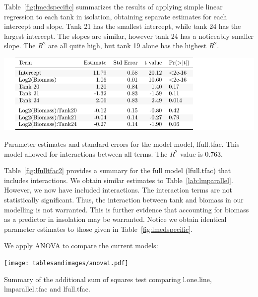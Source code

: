 Table~\ref{fig:lmedspecific} summarizes the results of applying simple linear regression to each tank in isolation, obtaining separate estimates for each intercept and slope. Tank 21 has the smallest intercept, while tank 24 has the largest intercept. The slopes are similar, however tank 24 has a noticeably smaller slope. The $R^{2}$ are all quite high, but tank 19 alone has the highest $R^{2}$. 



   \vspace{12pt}



\begin{table}[H]
\includegraphics{Chapter3Images/lfulltfac.pdf}
\caption{Parameter estimates and standard errors for the model model, lfull.tfac. This model allowed for interactions between all terms. The $R^{2}$ value is 0.763.}
\label{fig:lfulltfac2}
\end{table}

Table~\ref{fig:lfulltfac2} provides a summary for the full model (lfull.tfac) that includes interactions. We obtain similar estimates to Table~\ref{lab:lmparallel}. However, we now have included interactions. The interaction terms are not statistically significant.  Thus, the interaction between tank and biomass in our modelling is not warranted. This is further evidence that accounting for biomass as a predictor in insolation may be warranted. Notice we obtain identical parameter estimates to those given in Table~\ref{fig:lmedspecific}.

\newpage

We apply ANOVA to compare the current models:

   \vspace{12pt}



\begin{table}[H]
\texttt{[image: tablesandimages/anova1.pdf]}
\caption{Summary of the additional sum of squares test comparing l.one.line,  lmparallel.tfac and lfull.tfac.}
\label{fig:anovacompare2}
\end{table}


